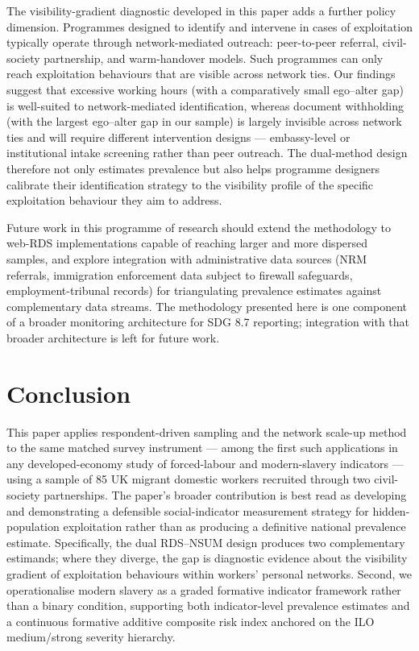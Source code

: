 \documentclass[
  12pt,
  letterpaper,
  DIV=11,
  numbers=noendperiod]{scrartcl}
\begin{document}
The visibility-gradient diagnostic developed in this paper adds a
further policy dimension. Programmes designed to identify and intervene
in cases of exploitation typically operate through network-mediated
outreach: peer-to-peer referral, civil-society partnership, and
warm-handover models. Such programmes can only reach exploitation
behaviours that are visible across network ties. Our findings suggest
that excessive working hours (with a comparatively small ego--alter gap)
is well-suited to network-mediated identification, whereas document
withholding (with the largest ego--alter gap in our sample) is largely
invisible across network ties and will require different intervention
designs --- embassy-level or institutional intake screening rather than
peer outreach. The dual-method design therefore not only estimates
prevalence but also helps programme designers calibrate their
identification strategy to the visibility profile of the specific
exploitation behaviour they aim to address.

Future work in this programme of research should extend the methodology
to web-RDS implementations capable of reaching larger and more dispersed
samples, and explore integration with administrative data sources (NRM
referrals, immigration enforcement data subject to firewall safeguards,
employment-tribunal records) for triangulating prevalence estimates
against complementary data streams. The methodology presented here is
one component of a broader monitoring architecture for SDG 8.7
reporting; integration with that broader architecture is left for future
work.

\section{Conclusion}\label{conclusion}

This paper applies respondent-driven sampling and the network scale-up
method to the same matched survey instrument --- among the first such
applications in any developed-economy study of forced-labour and
modern-slavery indicators --- using a sample of 85 UK migrant domestic
workers recruited through two civil-society partnerships. The paper's
broader contribution is best read as developing and demonstrating a
defensible social-indicator measurement strategy for hidden-population
exploitation rather than as producing a definitive national prevalence
estimate. Specifically, the dual RDS--NSUM design produces two
complementary estimands; where they diverge, the gap is diagnostic
evidence about the visibility gradient of exploitation behaviours within
workers' personal networks. Second, we operationalise modern slavery as
a graded formative indicator framework rather than a binary condition,
supporting both indicator-level prevalence estimates and a continuous
formative additive composite risk index anchored on the ILO
medium/strong severity hierarchy.
\end{document}
